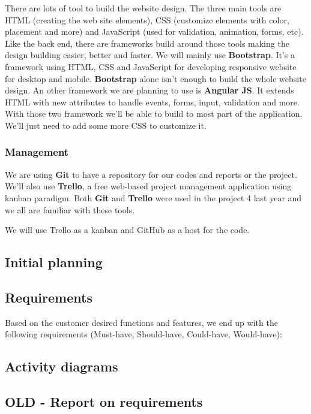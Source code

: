There are lots of tool to build the website design. The three main tools are HTML (creating the web site elements), CSS (customize elements with color, placement and more) and JavaScript (used for validation, animation, forms, etc). Like the back end, there are frameworks build around those tools making the design building easier, better and faster. We will mainly use \textbf{Bootstrap}. It's a framework using HTML, CSS and JavaScript for developing responsive website for desktop and mobile. \textbf{Bootstrap} alone isn't enough to build the whole website design. An other framework we are planning to use is \textbf{Angular JS}. It extends HTML with new attributes to handle events, forms, input, validation and more. With those two framework we'll be able to build to most part of the application. We'll just need to add some more CSS to customize it.

\subsubsection{Management}

We are using \textbf{Git} to have a repository for our codes and reports or the project. We'll also use \textbf{Trello}, a free web-based project management application using kanban paradigm. Both \textbf{Git} and \textbf{Trello} were used in the project 4 last year and we all are familiar with these tools.

We will use Trello as a kanban and GitHub as a host for the code. \newline
\fi
\subsection{Initial planning}
\subsection{Requirements}
Based on the customer desired functions and features, we end up with the following requirements (Must-have, Should-have, Could-have, Would-have):



\subsection{Activity diagrams}
\subsection{OLD - Report on requirements}

